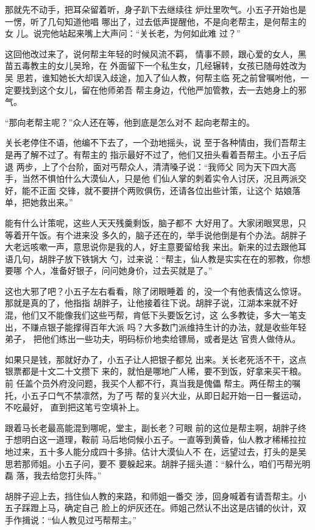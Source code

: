 那就先不动手，把耳朵留着听，身子趴下去继续往
炉灶里吹气。小五子开始也是一愣，听了几句知道他唱
哪出了，过去低声提醒他，不是向老帮主，是何帮主的女
儿。说完他站起来嘴上大声问：“关长老，为何如此难
过？”

这回他改过来了，说何帮主年轻的时候风流不羁，
情事不顾，跟心爱的女人，黑苗五毒教主的女儿吴玲，在
外面留下一个私生女，几经辗转，女孩已随母姓改为吴
思若，谁知她长大却误入歧途，加入了仙人教，何帮主临
死之前曾嘱咐他，一定要找到这个女儿，留在他师弟吾
帮主身边，代他严加管教，去一去她身上的邪气。

“那向老帮主呢？”众人还在等，他到底是怎么对不
起向老帮主的。

关长老停住不语，他编不下去了，一个劲地摇头，说
至于各种情由，我们吾帮主是再了解不过了。有帮主的
指示最好不过了，他们又扭头看着吾帮主。小五子后退
两步，上了个台阶，面对丐帮众人，清清嗓子说：“我师父
同为天下四大高手，当然不惧怕什么大漠仙人，只是他
们仙人掌的刺着实令人讨厌，况且两派交好，能不正面
交锋，就不要拼个两败俱伤，还请各位出些计策，让这个
姑娘落单，把她救出来。”

能有什么计策呢，这些人天天残羹剩饭，脑子都不
大好用了。大家闭眼冥思，只等着开午饭。有个进来没
多久的，脑子还在的，举手说他倒是有个办法。胡胖子
大老远咳嗽一声，意思说你是我的人，好主意要留给我
来出。新来的过去跟他耳语几句，胡胖子放下铁锅大
勺，过来说：“帮主，仙人教是实实在在的邪教，你想要哪
个人，准备好银子，问问她身价，过去买就是了。”

这也大邪了吧？小五子左右看看，除了闭眼睡着
的，没一个有他表情这么惊讶。那就是真的了，他指指
胡胖子，让他接着往下说。胡胖子说，江湖本来就不好
混，他们又不能像我们这些丐帮，肯低下头要饭乞讨，这
么多教徒，多大一笔支出，不赚点银子能撑得百年大派
吗？大多数门派维持生计的办法，就是收些年轻弟子，
把他们练出一些功夫，明码标价地卖给镖局，或者是达
官贵人做侍从。

如果只是钱，那就好办了，小五子让人把银子都兑
出来。关长老死活不干，这点银票都是十文二十文攒下
来的，就怕是哪地广人稀，要不到饭，好拿来买干粮。前
任盖个员外府没问题，我买个人都不行，真当我是傀儡
帮主。两任帮主的嘱托，小五子口气不禁凛然，为了丐
帮的复兴大业，从即日起开始一日一餐运动，不吃最好，
直到把这笔亏空填补上。

跟着马长老最高能混到哪呢，堂主，副长老？可眼
前的这位是帮主啊，胡胖子终于想明白这一道理，鞍前
马后地伺候小五子。一直等到黄昏，仙人教才稀稀拉拉
地过来，五十多人能分成四十多排。估计大漠仙人不
在，远望过去，打头的是吴思若那师姐。小五子问，要不
要躲起来。胡胖子摇头道：“躲什么，咱们丐帮光明磊
落，我去给您打头阵。”

胡胖子迎上去，挡住仙人教的来路，和师姐一番交
涉，回身喊着有请吾帮主。小五子踩蹬上马，确定自己
脸上的炉灰还在。师姐己然认不出这是店铺的伙计，双
手作揖说：“仙人教见过丐帮帮主。”

